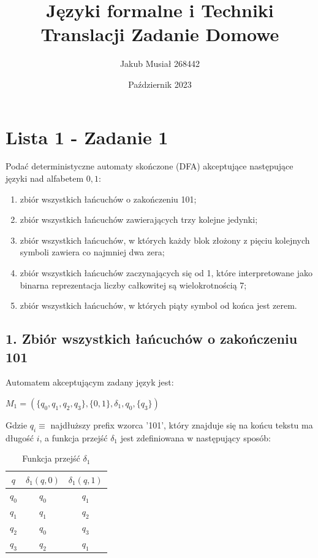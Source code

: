 \documentclass[12pt]{article}
\title{Języki formalne i Techniki Translacji \newline Zadanie Domowe}
\author{Jakub Musiał 268442}
\date{Październik 2023}
\begin{document}
\maketitle

\hspace{1cm}

\section*{Lista 1 - Zadanie 1}
    Podać deterministyczne automaty skończone (DFA) akceptujące następujące języki nad
    alfabetem ${0, 1}$:
    \begin{enumerate}
        \item zbiór wszystkich łańcuchów o zakończeniu 101;
        \item zbiór wszystkich łańcuchów zawierających trzy kolejne jedynki;
        \item zbiór wszystkich łańcuchów, w których każdy blok złożony z pięciu kolejnych symboli
        zawiera co najmniej dwa zera;
        \item zbiór wszystkich łańcuchów zaczynających się od 1, które interpretowane jako binarna
        reprezentacja liczby całkowitej są wielokrotnością 7;
        \item zbiór wszystkich łańcuchów, w których piąty symbol od końca jest zerem.
    \end{enumerate}

\newpage

\subsection*{1. Zbiór wszystkich łańcuchów o zakończeniu 101}
    Automatem akceptującym zadany język jest:
    \begin{center}
    \begin{math}
        M_1 = (\{q_0, q_1, q_2, q_3\}, \{0, 1\}, \delta_1, q_0, \{q_3\})
    \end{math}
    \end{center}

    \noindent Gdzie $q_i \equiv $ najdłuższy prefix wzorca '101', który znajduje się na końcu tekstu ma długość $i$,
    a funkcja przejść $\delta_1$ jest zdefiniowana w następujący sposób:

    \begin{table}[h!]
        \centering
        \begin{tabularx}{0.255\textwidth}{| c | c | c |}
            \hline
            $q$ & $\delta_1(q, 0)$ & $\delta_1(q, 1)$ \\
            \hline
            $q_0$ & $q_0$ & $q_1$ \\
            $q_1$ & $q_1$ & $q_2$ \\
            $q_2$ & $q_0$ & $q_3$ \\
            $q_3$ & $q_2$ & $q_1$ \\
            \hline
        \end{tabularx}
        \caption{Funkcja przejść $\delta_1$}
        \label{table:delta_1}
    \end{table}
\end{document}
